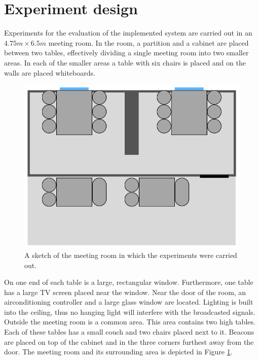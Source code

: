 \section{Experiment design}\label{sec:experiment_design}
Experiments for the evaluation of the implemented system are carried out in an $4.75m \times 6.5m$ meeting room.
In the room, a partition and a cabinet are placed between two tables, effectively dividing a single meeting room into two smaller areas. 
In each of the smaller areas a table with six chairs is placed and on the walls are placed whiteboards.
\begin{figure}[h]
    \centering
    \includegraphics[scale=0.7]{images/experiment_room.png}
    \caption{A sketch of the meeting room in which the experiments were carried out.}
    \label{fig:experiment_room}
\end{figure}
On one end of each table is a large, rectangular window.
Furthermore, one table has a large TV screen placed near the window. 
Near the door of the room, an airconditioning controller and a large glass window are located.
Lighting is built into the ceiling, thus no hanging light will interfere with the broadcasted signals. 
Outside the meeting room is a common area.
This area contains two high tables.
Each of these tables has a small couch and two chairs placed next to it.
Beacons are placed on top of the cabinet and in the three corners furthest away from the door.   
The meeting room and its surrounding area is depicted in Figure \ref{fig:experiment_room}.


